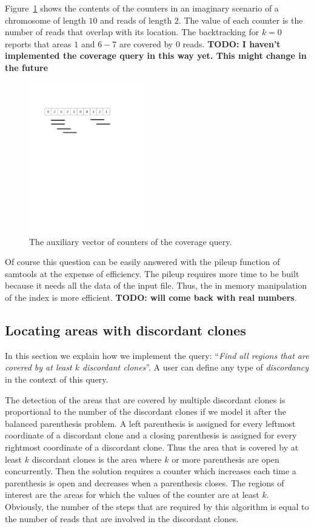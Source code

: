 \documentclass[10pt,fullpage]{article}
\newcommand{\fref}[1]{\mbox{Figure~\ref{#1}}}
\begin{document}
\fref{fig:coverage-example} shows the contents of the counters in an
imaginary scenario of a chromosome of length $10$ and reads of length
$2$. The value of each counter is the number of reads that overlap with 
its location. The backtracking for $k=0$ reports that areas $1$ and
$6-7$ are covered by $0$ reads. {\bf TODO: I haven't implemented the
coverage query in this way yet. This might change in the future}

\begin{figure}[hbt]
  \centering
  \includegraphics[trim = 15mm 185mm 60mm 40mm,clip,width=2in]{fig/coverage_example.pdf}
  \caption{{\footnotesize The auxiliary vector of counters of the
  coverage query.}}
  \label{fig:coverage-example}
\end{figure}

Of course this question can be easily answered with the pileup
function of samtools at the expense of efficiency. The pileup requires
more time to be built because it needs all the data of the input file.
Thus, the in memory manipulation of the index is more efficient. {\bf
TODO: will come back with real numbers}.

\subsection{Locating areas with discordant clones}
\label{sec:discordant}

In this section we explain how we implement the query: ``{\em Find all
regions that are covered by at least $k$ discordant clones}''. A user
can define any type of {\em discordancy} in the context of this query. 

The detection of the areas that are covered by multiple discordant
clones is proportional to the number of the discordant clones if we
model it after the balanced parenthesis problem. A left parenthesis is 
assigned for every leftmost coordinate of a discordant clone and a closing 
parenthesis is assigned for every rightmost coordinate of a discordant clone. 
Thus the area that is covered by at least $k$ discordant clones is the
area where $k$ or more parenthesis are open concurrently. Then the
solution requires a counter which increases each time a parenthesis is
open and decreases when a parenthesis closes. The regions of interest
are the areas for which the values of the counter are at least $k$.
Obviously, the number of the steps that are required by this algorithm
is equal to the number of reads that are involved in the discordant
clones.
\end{document}
